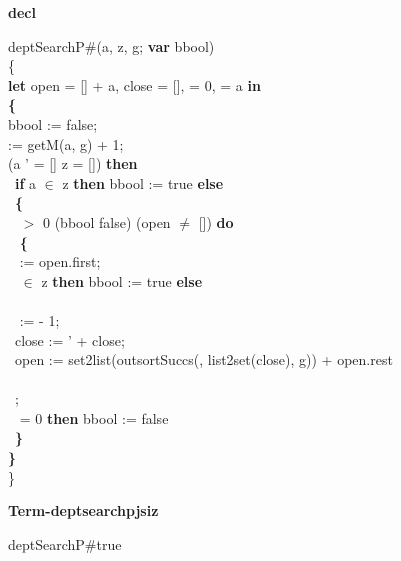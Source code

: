 {\parindent0cm


{\LARGE\bf decl}

\medskip

deptSearchP\#(a, z, g; {\bf var} bbool) \\
\{\\
{\bf let} open = [] + a, close = [],  = 0,  = a {\bf in}\\
{\bf \{}\\
\tabbe bbool := false;\\
\tabbe {} := getM(a, g) + 1;\\
 \Not (a ' = [] \Or z = []) {\bf then}\\
\tabbe \tabif\  {\bf if} a $\in$ z {\bf then} bbool := true {\bf else}\\
\tabbe \tabif\  {\bf \{}\\
\tabbe \tabif\   $>$ 0 \And (bbool \Equiv false) \And (open $\neq$ []) {\bf do}\\
\tabbe \tabif\ \tabbe {} {\bf \{}\\
\tabbe \tabif\ \tabbe {}\tabbe {} := open.first;\\
\tabbe \tabif\ \tabbe {}  $\in$ z {\bf then} bbool := true {\bf else}\\
\tabbe \tabif\ \tabbe {}\tabbe  {\bf \{}\\
\tabbe \tabif\ \tabbe {}\tabbe \tabbe {} :=  - 1;\\
\tabbe \tabif\ \tabbe {}\tabbe \tabbe close :=  ' + close;\\
\tabbe \tabif\ \tabbe {}\tabbe \tabbe open := set2list(outsortSuccs(, list2set(close), g)) + open.rest\\
\tabbe \tabif\ \tabbe {}\tabbe {\bf \}}\\
\tabbe \tabif\ \tabbe {};\\
\tabbe \tabif\   = 0 {\bf then} bbool := false\\
\tabbe \tabif\ {\bf \}}\\
{\bf \}}\\
\}

\medskip

{\LARGE\bf Term-deptsearchpjsiz}

\medskip

 \Fol \Do deptSearchP\#\Dc true

\begin{itemize}


\end{itemize}}
